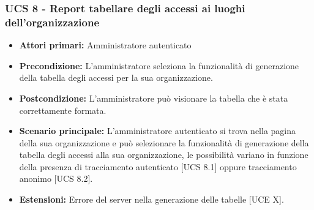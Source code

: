\subsubsection{UCS 8 - Report tabellare degli accessi ai luoghi dell'organizzazione}%
\begin{itemize}
\item \textbf{Attori primari:} Amministratore autenticato
\item \textbf{Precondizione:} L'amministratore seleziona la funzionalità di generazione della tabella degli accessi per la sua organizzazione.
\item \textbf{Postcondizione:} L'amministratore può visionare la tabella che è stata correttamente formata.
\item \textbf{Scenario principale:} L'amministratore autenticato si trova nella pagina della sua organizzazione e può selezionare la funzionalità di generazione della tabella degli accessi alla sua organizzazione, le possibilità variano in funzione della presenza di tracciamento autenticato [UCS 8.1] oppure tracciamento anonimo [UCS 8.2].
\item \textbf{Estensioni:} Errore del server nella generazione delle tabelle [UCE X].
\end{itemize}

